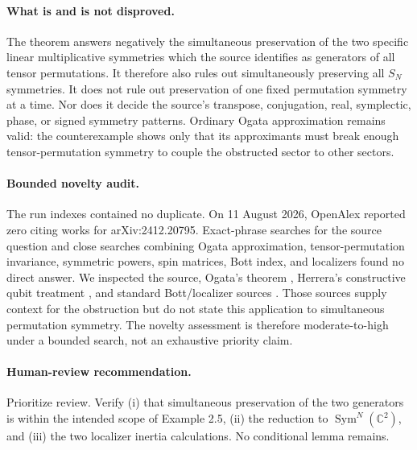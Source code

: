 \documentclass[11pt]{article}
\newcommand{\C}{\mathbb C}
\newcommand{\Sym}{\operatorname{Sym}}
\begin{document}
\paragraph{What is and is not disproved.}
The theorem answers negatively the simultaneous preservation of the two
specific linear multiplicative symmetries which the source identifies as
generators of all tensor permutations.  It therefore also rules out
simultaneously preserving all $S_N$ symmetries.  It does not rule out
preservation of one fixed permutation symmetry at a time.  Nor does it decide
the source's transpose, conjugation, real, symplectic, phase, or signed
symmetry patterns.  Ordinary Ogata approximation remains valid: the
counterexample shows only that its approximants must break enough
tensor-permutation symmetry to couple the obstructed sector to other sectors.

\paragraph{Bounded novelty audit.}
The run indexes contained no duplicate.  On 11 August 2026, OpenAlex reported
zero citing works for arXiv:2412.20795.  Exact-phrase searches for the source
question and close searches combining Ogata approximation, tensor-permutation
invariance, symmetric powers, spin matrices, Bott index, and localizers found
no direct answer.  We inspected the source, Ogata's theorem
\cite{Ogata2013}, Herrera's constructive qubit treatment \cite{Herrera2022},
and standard Bott/localizer sources \cite{HastingsLoring,LoringGuide}.
Those sources supply context for the obstruction but do not state this
application to simultaneous permutation symmetry.  The novelty assessment is
therefore moderate-to-high under a bounded search, not an exhaustive priority
claim.

\paragraph{Human-review recommendation.}
Prioritize review.  Verify (i) that simultaneous preservation of the two
generators is within the intended scope of Example 2.5, (ii) the reduction to
$\Sym^N(\C^2)$, and (iii) the two localizer inertia calculations.  No
conditional lemma remains.
\end{document}
